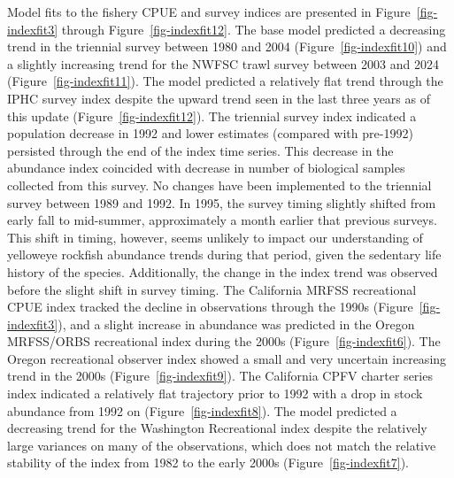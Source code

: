 \documentclass[
]{scrartcl}
\begin{document}
Model fits to the fishery CPUE and survey indices are presented in
Figure~\ref{fig-indexfit3} through Figure~\ref{fig-indexfit12}. The base
model predicted a decreasing trend in the triennial survey between 1980
and 2004 (Figure~\ref{fig-indexfit10}) and a slightly increasing trend
for the NWFSC trawl survey between 2003 and 2024
(Figure~\ref{fig-indexfit11}). The model predicted a relatively flat
trend through the IPHC survey index despite the upward trend seen in the
last three years as of this update (Figure~\ref{fig-indexfit12}). The
triennial survey index indicated a population decrease in 1992 and lower
estimates (compared with pre-1992) persisted through the end of the
index time series. This decrease in the abundance index coincided with
decrease in number of biological samples collected from this survey. No
changes have been implemented to the triennial survey between 1989 and
1992. In 1995, the survey timing slightly shifted from early fall to
mid-summer, approximately a month earlier that previous surveys. This
shift in timing, however, seems unlikely to impact our understanding of
yelloweye rockfish abundance trends during that period, given the
sedentary life history of the species. Additionally, the change in the
index trend was observed before the slight shift in survey timing. The
California MRFSS recreational CPUE index tracked the decline in
observations through the 1990s (Figure~\ref{fig-indexfit3}), and a
slight increase in abundance was predicted in the Oregon MRFSS/ORBS
recreational index during the 2000s (Figure~\ref{fig-indexfit6}). The
Oregon recreational observer index showed a small and very uncertain
increasing trend in the 2000s (Figure~\ref{fig-indexfit9}). The
California CPFV charter series index indicated a relatively flat
trajectory prior to 1992 with a drop in stock abundance from 1992 on
(Figure~\ref{fig-indexfit8}). The model predicted a decreasing trend for
the Washington Recreational index despite the relatively large variances
on many of the observations, which does not match the relative stability
of the index from 1982 to the early 2000s (Figure~\ref{fig-indexfit7}).
\end{document}
